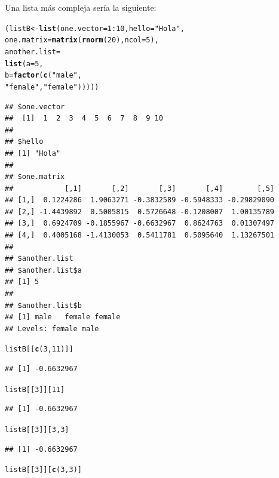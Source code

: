 \documentclass{config/apuntes}\usepackage[]{graphicx}\usepackage[]{xcolor}
\makeatletter
\newcommand{\hlnum}[1]{\textcolor[rgb]{0.686,0.059,0.569}{#1}}%
\newcommand{\hlsng}[1]{\textcolor[rgb]{0.192,0.494,0.8}{#1}}%
\newcommand{\hlopt}[1]{\textcolor[rgb]{0,0,0}{#1}}%
\newcommand{\hldef}[1]{\textcolor[rgb]{0.345,0.345,0.345}{#1}}%
\newcommand{\hlkwb}[1]{\textcolor[rgb]{0.69,0.353,0.396}{#1}}%
\newcommand{\hlkwc}[1]{\textcolor[rgb]{0.333,0.667,0.333}{#1}}%
\newcommand{\hlkwd}[1]{\textcolor[rgb]{0.737,0.353,0.396}{\textbf{#1}}}%
\newenvironment{kframe}{%
 \def\at@end@of@kframe{}%
 \ifinner\ifhmode%
  \def\at@end@of@kframe{\end{minipage}}%
  \begin{minipage}{\columnwidth}%
 \fi\fi%
 \def\FrameCommand##1{\hskip\@totalleftmargin \hskip-\fboxsep
 \colorbox{shadecolor}{##1}\hskip-\fboxsep
     \hskip-\linewidth \hskip-\@totalleftmargin \hskip\columnwidth}%
 \MakeFramed {\advance\hsize-\width
   \@totalleftmargin\z@ \linewidth\hsize
   \@setminipage}}%
 {\par\unskip\endMakeFramed%
 \at@end@of@kframe}
\newenvironment{knitrout}{}{} %
\makeatother
\begin{document}
Una lista más compleja sería la siguiente:
\begin{knitrout}
\color{fgcolor}\begin{kframe}
\begin{alltt}
\hldef{(listB} \hlkwb{<-} \hlkwd{list}\hldef{(}\hlkwc{one.vector} \hldef{=} \hlnum{1}\hlopt{:}\hlnum{10}\hldef{,}  \hlkwc{hello} \hldef{=} \hlsng{"Hola"}\hldef{,}
               \hlkwc{one.matrix} \hldef{=} \hlkwd{matrix}\hldef{(}\hlkwd{rnorm}\hldef{(}\hlnum{20}\hldef{),} \hlkwc{ncol} \hldef{=} \hlnum{5}\hldef{),}
               \hlkwc{another.list} \hldef{=}
               \hlkwd{list}\hldef{(}\hlkwc{a} \hldef{=} \hlnum{5}\hldef{,}
                    \hlkwc{b} \hldef{=} \hlkwd{factor}\hldef{(}\hlkwd{c}\hldef{(}\hlsng{"male"}\hldef{,}
                      \hlsng{"female"}\hldef{,} \hlsng{"female"}\hldef{)))))}
\end{alltt}
\begin{verbatim}
## $one.vector
##  [1]  1  2  3  4  5  6  7  8  9 10
## 
## $hello
## [1] "Hola"
## 
## $one.matrix
##            [,1]       [,2]       [,3]       [,4]        [,5]
## [1,]  0.1224286  1.9063271 -0.3832589 -0.5948333 -0.29829090
## [2,] -1.4439892  0.5005815  0.5726648 -0.1208007  1.00135789
## [3,]  0.6924709 -0.1855967 -0.6632967  0.8624763  0.01307497
## [4,]  0.4005168 -1.4130053  0.5411781  0.5095640  1.13267501
## 
## $another.list
## $another.list$a
## [1] 5
## 
## $another.list$b
## [1] male   female female
## Levels: female male
\end{verbatim}
\begin{alltt}
\hldef{listB[[}\hlkwd{c}\hldef{(}\hlnum{3}\hldef{,} \hlnum{11}\hldef{)]]}
\end{alltt}
\begin{verbatim}
## [1] -0.6632967
\end{verbatim}
\begin{alltt}
\hldef{listB[[}\hlnum{3}\hldef{]][}\hlnum{11}\hldef{]}
\end{alltt}
\begin{verbatim}
## [1] -0.6632967
\end{verbatim}
\begin{alltt}
\hldef{listB[[}\hlnum{3}\hldef{]][}\hlnum{3}\hldef{,} \hlnum{3}\hldef{]}
\end{alltt}
\begin{verbatim}
## [1] -0.6632967
\end{verbatim}
\begin{alltt}
\hldef{listB[[}\hlnum{3}\hldef{]][}\hlkwd{c}\hldef{(}\hlnum{3}\hldef{,} \hlnum{3}\hldef{)]}

\end{alltt}
\end{kframe}
\end{knitrout}
\end{document}
